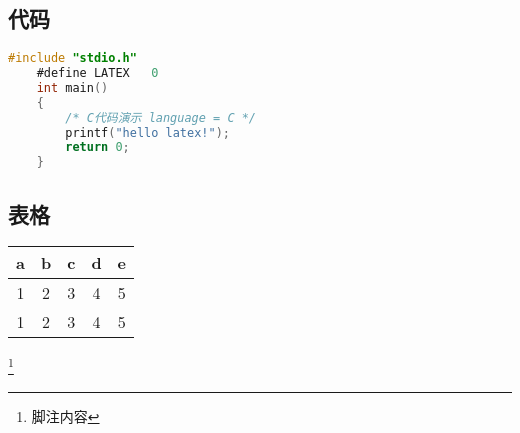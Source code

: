 \documentclass{book}
\begin{document}
\subsection{代码}
\begin{lstlisting}[language = C]
    #include "stdio.h"
    #define LATEX   0
    int main()
    {
        /* C代码演示 language = C */
        printf("hello latex!");
        return 0;
    }
\end{lstlisting}

\subsection{表格}
\begin{tabular}{ccccc}
    \hline
    \hline
    a & b & c & d & e\\
    \hline
    1 & 2 & 3 & 4 & 5\\ 
    1 & 2 & 3 & 4 & 5\\
    \hline
\end{tabular}

\footnote{脚注内容}​
\end{document}
